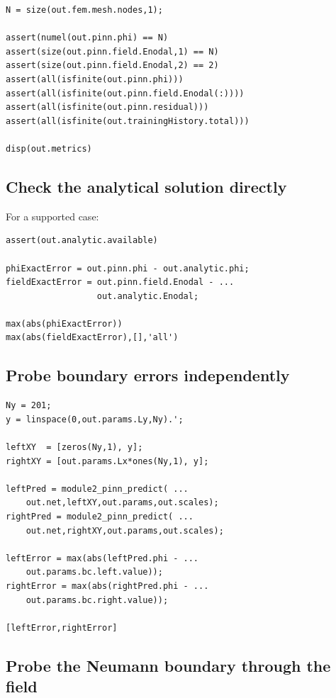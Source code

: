 \documentclass[11pt]{article}
\begin{document}
\begin{lstlisting}[style=projectmatlab]
N = size(out.fem.mesh.nodes,1);

assert(numel(out.pinn.phi) == N)
assert(size(out.pinn.field.Enodal,1) == N)
assert(size(out.pinn.field.Enodal,2) == 2)
assert(all(isfinite(out.pinn.phi)))
assert(all(isfinite(out.pinn.field.Enodal(:))))
assert(all(isfinite(out.pinn.residual)))
assert(all(isfinite(out.trainingHistory.total)))

disp(out.metrics)
\end{lstlisting}

\subsection{Check the analytical solution directly}

For a supported case:
\begin{lstlisting}[style=projectmatlab]
assert(out.analytic.available)

phiExactError = out.pinn.phi - out.analytic.phi;
fieldExactError = out.pinn.field.Enodal - ...
                  out.analytic.Enodal;

max(abs(phiExactError))
max(abs(fieldExactError),[],'all')
\end{lstlisting}

\subsection{Probe boundary errors independently}

\begin{lstlisting}[style=projectmatlab]
Ny = 201;
y = linspace(0,out.params.Ly,Ny).';

leftXY  = [zeros(Ny,1), y];
rightXY = [out.params.Lx*ones(Ny,1), y];

leftPred = module2_pinn_predict( ...
    out.net,leftXY,out.params,out.scales);
rightPred = module2_pinn_predict( ...
    out.net,rightXY,out.params,out.scales);

leftError = max(abs(leftPred.phi - ...
    out.params.bc.left.value));
rightError = max(abs(rightPred.phi - ...
    out.params.bc.right.value));

[leftError,rightError]
\end{lstlisting}

\subsection{Probe the Neumann boundary through the field}
\end{document}
